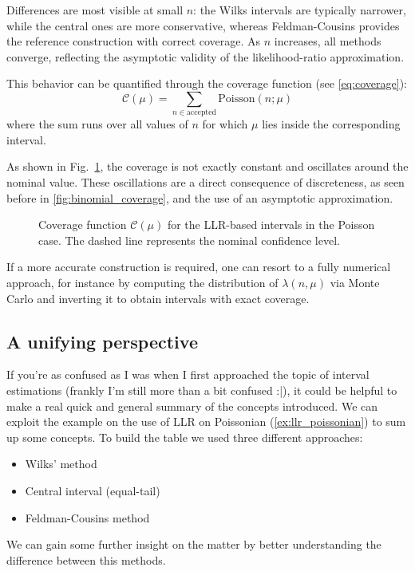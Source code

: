 \begin{example}
	Differences are most visible at small $n$: the Wilks intervals are typically narrower, while the central ones are more conservative, whereas Feldman-Cousins provides the reference construction with correct coverage. As $n$ increases, all methods converge, reflecting the asymptotic validity of the likelihood-ratio approximation.

	This behavior can be quantified through the coverage function (see \ref{eq:coverage}):
	\[
	\mathcal{C}(\mu) = \sum_{n \in \text{accepted}} \text{Poisson}(n;\mu)
	\]
	where the sum runs over all values of $n$ for which $\mu$ lies inside the corresponding interval. 
	
	As shown in Fig.~\ref{fig:llr_poisson_coverage}, the coverage is not exactly constant and oscillates around the nominal value. These oscillations are a direct consequence of discreteness, as seen before in \ref{fig:binomial_coverage}, and the use of an asymptotic approximation.
	
	\begin{figure}[H]
		\centering
		
		\caption{Coverage function $\mathcal{C}(\mu)$ for the LLR-based intervals in the Poisson case. The dashed line represents the nominal confidence level.}
		\label{fig:llr_poisson_coverage}
	\end{figure}
	
	If a more accurate construction is required, one can resort to a fully numerical approach, for instance by computing the distribution of $\lambda(n,\mu)$ via Monte Carlo and inverting it to obtain intervals with exact coverage.
\end{example}

\subsection[A unifying perspective]{A unifying perspective\protect\sidenotemark}
If you're as confused as I was when I first approached the topic of interval estimations (frankly I'm still more than a bit confused :|), it could be helpful to make a real quick and general summary of the concepts introduced. We can exploit the example on the use of LLR on Poissonian (\ref{ex:llr_poissonian}) to sum up some concepts. To build the table we used three different approaches:
\begin{itemize}
	\item Wilks' method
	\item Central interval (equal-tail)
	\item Feldman-Cousins method
\end{itemize}
We can gain some further insight on the matter by better understanding the difference between this methods.

